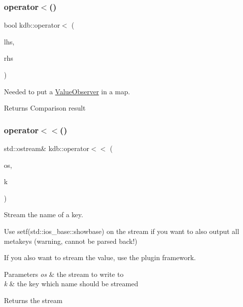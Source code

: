 \subsubsection{\texorpdfstring{operator$<$()}{operator<()}}
{\footnotesize\ttfamily bool kdb\+::operator$<$ (\begin{DoxyParamCaption}\item[{\hyperlink{classkdb_1_1ValueObserver}{Value\+Observer} const \&}]{lhs,  }\item[{\hyperlink{classkdb_1_1ValueObserver}{Value\+Observer} const \&}]{rhs }\end{DoxyParamCaption})\hspace{0.3cm}{\ttfamily [inline]}}



Needed to put a \hyperlink{classkdb_1_1ValueObserver}{Value\+Observer} in a map. 

\begin{DoxyReturn}{Returns}
Comparison result 
\end{DoxyReturn}
\mbox{\label{namespacekdb_ac004b5ba79154cbba02d5e5d83337e47}} 
\subsubsection{\texorpdfstring{operator$<$$<$()}{operator<<()}\hspace{0.1cm}{\footnotesize\ttfamily [1/2]}}
{\footnotesize\ttfamily std\+::ostream\& kdb\+::operator$<$$<$ (\begin{DoxyParamCaption}\item[{std\+::ostream \&}]{os,  }\item[{\hyperlink{classkdb_1_1Key}{kdb\+::\+Key} const \&}]{k }\end{DoxyParamCaption})\hspace{0.3cm}{\ttfamily [inline]}}



Stream the name of a key. 

Use setf(std\+::ios\+\_\+base\+::showbase) on the stream if you want to also output all metakeys (warning, cannot be parsed back!)

If you also want to stream the value, use the plugin framework.


\begin{DoxyParams}{Parameters}
{\em os} & the stream to write to \\
\hline
{\em k} & the key which name should be streamed\\
\hline
\end{DoxyParams}
\begin{DoxyReturn}{Returns}
the stream 
\end{DoxyReturn}
\mbox{\label{namespacekdb_afd28754a48d420d2f2a41c5d8242f3fb}} 
